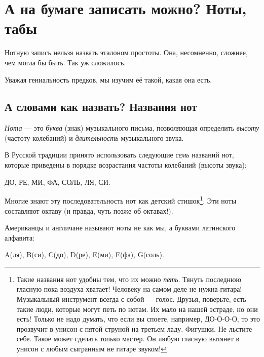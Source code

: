 \chapter{А на бумаге записать можно? Ноты, табы}
\label{ch:notes}

Нотную запись нельзя назвать эталоном простоты. Она, несомненно, сложнее, чем могла бы быть. Так уж сложилось.

Уважая гениальность предков, мы изучим её такой, какая она есть.


\section{А словами как назвать? Названия нот}
\label{ch:notes:names}

\emph{Нота} --- это \emph{буква} (знак) музыкального письма, позволяющая определить \emph{высоту} (частоту колебаний) и \emph{длительность} музыкального звука. 

В Русской традиции принято использовать следующие \emph{семь} названий нот, которые приведены в порядке возрастания частоты колебаний (высоты звука): 
\begin{center}
    ДО, РЕ, МИ, ФА, СОЛЬ, ЛЯ, СИ. 
\end{center}

Многие знают эту последовательность нот как детский стишок\footnote{Такие названия нот удобны тем, что их можно \emph{петь}. Тянуть последнюю гласную пока воздуха хватает! Человеку на самом деле не нужна гитара! Музыкальный инструмент всегда с собой --- голос. Друзья, поверьте, есть такие люди, которые могут петь по нотам. Их мало на нашей эстраде, но они есть! Только не надо думать, что если вы споете, например, ДО-О-О-О, то это прозвучит в унисон с пятой струной на третьем ладу. Фигушки. Не льстите себе. Такое может сделать только мастер. Он любую гласную вытянет в унисон с любым сыгранным не гитаре звуком!}. Эти ноты составляют октаву (и правда, чуть позже об октавах!).

Американцы и англичане называют ноты не как мы, а буквами латинского алфавита: 
\begin{center}
    A(ля), B(си), C(до), D(ре), E(ми), F(фа), G(соль).
\end{center}

